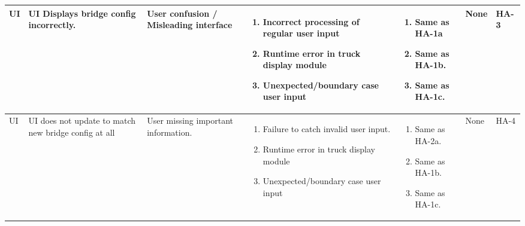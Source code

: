 \documentclass{article}
\begin{document}
\begin{landscape}
\begin{longtable}{|p{} | p{} | p{} | p{} | p{} | p{} | p{}|}
  \hline

  UI & UI Displays bridge config incorrectly. & User confusion / Misleading interface &
  \begin{enumerate}[leftmargin=*, label={\alph*.}, itemsep=1pt, topsep=0pt, partopsep=0pt] 
    \item Incorrect processing of regular user input
    \item Runtime error in truck display module
    \item Unexpected/boundary case user input 
  \end{enumerate} &
  \begin{enumerate}[leftmargin=*, label={\alph*.}, itemsep=1pt, topsep=0pt, partopsep=0pt] 
    \item Same as HA-1a
    \item Same as HA-1b.
    \item Same as HA-1c.
  \end{enumerate} & 
  None & HA-3 \\

  \hline

  UI & UI does not update to match new bridge config at all & User missing important information. &
  \begin{enumerate}[leftmargin=*, label={\alph*.}, itemsep=1pt, topsep=0pt, partopsep=0pt] 
    \item Failure to catch invalid user input.
    \item Runtime error in truck display module
    \item Unexpected/boundary case user input
  \end{enumerate} &
  \begin{enumerate}[leftmargin=*, label={\alph*.}, itemsep=1pt, topsep=0pt, partopsep=0pt] 
    \item Same as HA-2a.
    \item  Same as HA-1b.
    \item Same as HA-1c.
  \end{enumerate} &
  None & HA-4 \\

  \hline


\end{longtable}
\end{landscape}
\end{document}
